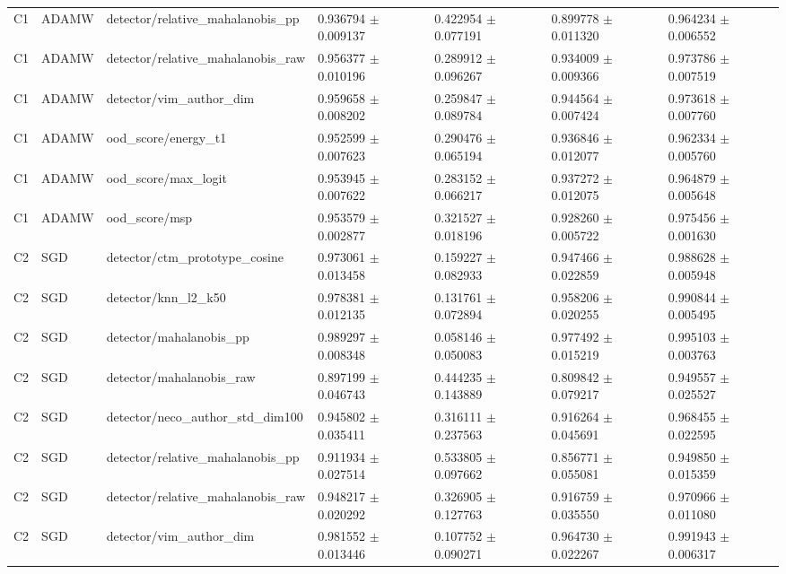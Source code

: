 \begin{longtable}{lllllll}
C1 & ADAMW & detector/relative\_mahalanobis\_pp & 0.936794 $\pm$ 0.009137 & 0.422954 $\pm$ 0.077191 & 0.899778 $\pm$ 0.011320 & 0.964234 $\pm$ 0.006552 \\
C1 & ADAMW & detector/relative\_mahalanobis\_raw & 0.956377 $\pm$ 0.010196 & 0.289912 $\pm$ 0.096267 & 0.934009 $\pm$ 0.009366 & 0.973786 $\pm$ 0.007519 \\
C1 & ADAMW & detector/vim\_author\_dim & 0.959658 $\pm$ 0.008202 & 0.259847 $\pm$ 0.089784 & 0.944564 $\pm$ 0.007424 & 0.973618 $\pm$ 0.007760 \\
C1 & ADAMW & ood\_score/energy\_t1 & 0.952599 $\pm$ 0.007623 & 0.290476 $\pm$ 0.065194 & 0.936846 $\pm$ 0.012077 & 0.962334 $\pm$ 0.005760 \\
C1 & ADAMW & ood\_score/max\_logit & 0.953945 $\pm$ 0.007622 & 0.283152 $\pm$ 0.066217 & 0.937272 $\pm$ 0.012075 & 0.964879 $\pm$ 0.005648 \\
C1 & ADAMW & ood\_score/msp & 0.953579 $\pm$ 0.002877 & 0.321527 $\pm$ 0.018196 & 0.928260 $\pm$ 0.005722 & 0.975456 $\pm$ 0.001630 \\
C2 & SGD & detector/ctm\_prototype\_cosine & 0.973061 $\pm$ 0.013458 & 0.159227 $\pm$ 0.082933 & 0.947466 $\pm$ 0.022859 & 0.988628 $\pm$ 0.005948 \\
C2 & SGD & detector/knn\_l2\_k50 & 0.978381 $\pm$ 0.012135 & 0.131761 $\pm$ 0.072894 & 0.958206 $\pm$ 0.020255 & 0.990844 $\pm$ 0.005495 \\
C2 & SGD & detector/mahalanobis\_pp & 0.989297 $\pm$ 0.008348 & 0.058146 $\pm$ 0.050083 & 0.977492 $\pm$ 0.015219 & 0.995103 $\pm$ 0.003763 \\
C2 & SGD & detector/mahalanobis\_raw & 0.897199 $\pm$ 0.046743 & 0.444235 $\pm$ 0.143889 & 0.809842 $\pm$ 0.079217 & 0.949557 $\pm$ 0.025527 \\
C2 & SGD & detector/neco\_author\_std\_dim100 & 0.945802 $\pm$ 0.035411 & 0.316111 $\pm$ 0.237563 & 0.916264 $\pm$ 0.045691 & 0.968455 $\pm$ 0.022595 \\
C2 & SGD & detector/relative\_mahalanobis\_pp & 0.911934 $\pm$ 0.027514 & 0.533805 $\pm$ 0.097662 & 0.856771 $\pm$ 0.055081 & 0.949850 $\pm$ 0.015359 \\
C2 & SGD & detector/relative\_mahalanobis\_raw & 0.948217 $\pm$ 0.020292 & 0.326905 $\pm$ 0.127763 & 0.916759 $\pm$ 0.035550 & 0.970966 $\pm$ 0.011080 \\
C2 & SGD & detector/vim\_author\_dim & 0.981552 $\pm$ 0.013446 & 0.107752 $\pm$ 0.090271 & 0.964730 $\pm$ 0.022267 & 0.991943 $\pm$ 0.006317 \\

\end{longtable}
